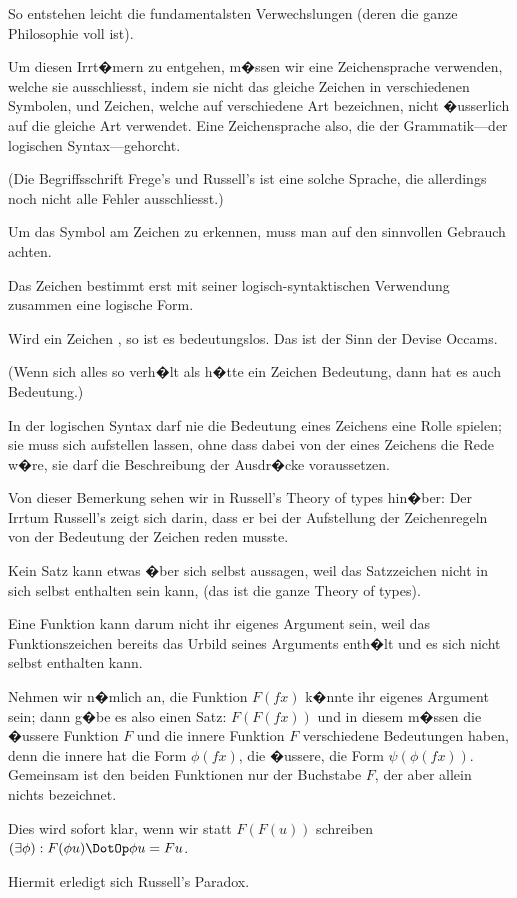 {So entstehen leicht die fundamentalsten Verwechslungen
(deren die ganze Philosophie voll
ist).}


{Um diesen Irrt�mern zu entgehen, m�ssen
wir eine Zeichensprache verwenden, welche sie
ausschliesst, indem sie nicht das gleiche Zeichen
in verschiedenen Symbolen, und Zeichen, welche
auf verschiedene Art bezeichnen, nicht �usserlich
auf die gleiche Art verwendet. Eine Zeichensprache
also, die der  Grammatik---der logischen
Syntax---gehorcht.

(Die Begriffsschrift Frege's und Russell's ist
eine solche Sprache, die allerdings noch nicht alle
Fehler ausschliesst.)}


{Um das Symbol am Zeichen zu erkennen, muss
man auf den sinnvollen Gebrauch achten.}


{Das Zeichen bestimmt erst mit seiner logisch-syntaktischen
Verwendung zusammen eine logische
Form.}


{Wird ein Zeichen , so ist
es bedeutungslos. Das ist der Sinn der Devise
Occams.

(Wenn sich alles so verh�lt als h�tte ein Zeichen
Bedeutung, dann hat es auch Bedeutung.)}


{In der logischen Syntax darf nie die Bedeutung
eines Zeichens eine Rolle spielen; sie muss sich
aufstellen lassen, ohne dass dabei von der 
eines Zeichens die Rede w�re, sie darf 
die Beschreibung der Ausdr�cke voraussetzen.}


{Von dieser Bemerkung sehen wir in Russell's
\glqq{}Theory of types\grqq{} hin�ber: Der Irrtum Russell's
zeigt sich darin, dass er bei der Aufstellung der
Zeichenregeln von der Bedeutung der Zeichen
reden musste.}


{Kein Satz kann etwas �ber sich selbst aussagen,
weil das Satzzeichen nicht in sich selbst enthalten
sein kann, (das ist die ganze \glqq{}Theory of types\grqq{}).}


{Eine Funktion kann darum nicht ihr eigenes
Argument sein, weil das Funktionszeichen bereits
das Urbild seines Arguments enth�lt und es sich
nicht selbst enthalten kann.

Nehmen wir n�mlich an, die Funktion $F (fx)$
k�nnte ihr eigenes Argument sein; dann g�be es
also einen Satz: \glqq{}$F(F(fx))$\grqq{} und in diesem m�ssen
die �ussere Funktion $F$ und die innere Funktion $F$
verschiedene Bedeutungen haben, denn die innere
hat die Form $\phi(fx)$, die �ussere, die Form $\psi(\phi(fx))$.
Gemeinsam ist den beiden Funktionen nur der
Buchstabe \glqq{}$F$\grqq{}, der aber allein nichts bezeichnet.

Dies wird sofort klar, wenn wir statt \glqq{}$F(F(u))$\grqq{}
schreiben \glqq{}$(\exists\phi) : F(\phi u) \DotOp \phi u = Fu$\grqq{}.

Hiermit erledigt sich Russell's Paradox.}


